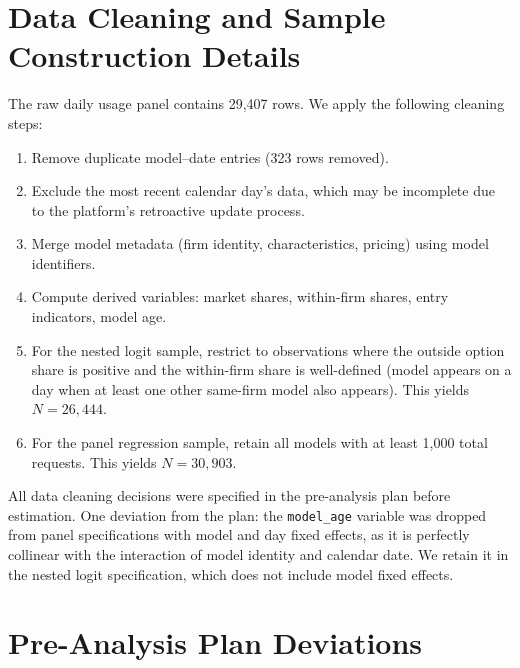 \documentclass[11pt, a4paper]{article}
\begin{document}
\begin{appendices}
\section{Data Cleaning and Sample Construction Details}

The raw daily usage panel contains 29,407 rows. We apply the following cleaning steps:
\begin{enumerate}[nosep]
\item Remove duplicate model--date entries (323 rows removed).
\item Exclude the most recent calendar day's data, which may be incomplete due to the platform's retroactive update process.
\item Merge model metadata (firm identity, characteristics, pricing) using model identifiers.
\item Compute derived variables: market shares, within-firm shares, entry indicators, model age.
\item For the nested logit sample, restrict to observations where the outside option share is positive and the within-firm share is well-defined (model appears on a day when at least one other same-firm model also appears). This yields $N = 26{,}444$.
\item For the panel regression sample, retain all models with at least 1,000 total requests. This yields $N = 30{,}903$.
\end{enumerate}

All data cleaning decisions were specified in the pre-analysis plan before estimation. One deviation from the plan: the \texttt{model\_age} variable was dropped from panel specifications with model and day fixed effects, as it is perfectly collinear with the interaction of model identity and calendar date. We retain it in the nested logit specification, which does not include model fixed effects.

\section{Pre-Analysis Plan Deviations}


\end{appendices}
\end{document}
